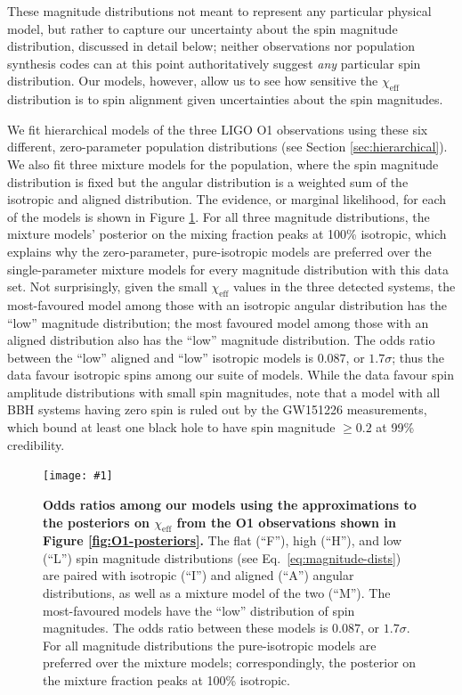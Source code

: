 \documentclass{nature}
\newcommand{\chieff}{\chi_\mathrm{eff}}
\newcommand{\OOneSigmaIsoAligned}{1.7}
\newcommand{\OOneOddsIsoAligned}{0.087}
\newcommand{\plotone}[1]{\texttt{[image: \#1]}}
\begin{document}
These magnitude distributions not meant to represent any particular
physical model, but rather to capture our uncertainty about the spin
magnitude distribution, discussed in detail below; neither
observations nor population synthesis codes can at this point
authoritatively suggest \emph{any} particular spin
distribution\cite{2015PhR...548....1M}.  Our models, however, allow us
to see how sensitive the $\chieff$ distribution is to spin alignment
given uncertainties about the spin magnitudes.

We fit hierarchical models of the three LIGO O1 observations using
these six different, zero-parameter population distributions (see
Section \ref{sec:hierarchical}).  We also fit three mixture models for
the population, where the spin magnitude distribution is fixed but the
angular distribution is a weighted sum of the isotropic and aligned
distribution.  The evidence, or marginal likelihood, for each of the
models is shown in Figure \ref{fig:O1-odds}.  For all three magnitude
distributions, the mixture models' posterior on the mixing fraction
peaks at 100\% isotropic, which explains why the zero-parameter,
pure-isotropic models are preferred over the single-parameter mixture
models for every magnitude distribution with this data set.  Not
surprisingly, given the small $\chieff$ values in the three detected
systems, the most-favoured model among those with an isotropic angular
distribution has the ``low'' magnitude distribution; the most favoured
model among those with an aligned distribution also has the ``low''
magnitude distribution.  The odds ratio between the ``low'' aligned
and ``low'' isotropic models is $\OOneOddsIsoAligned$, or
$\OOneSigmaIsoAligned\sigma$; thus the data favour isotropic spins
among our suite of models.  While the data favour spin amplitude
distributions with small spin magnitudes, note that a model with all
\ac{BBH} systems having zero spin is ruled out by the GW151226
measurements, which bound at least one black hole to have spin
magnitude $\geq 0.2$ at 99\% credibility\cite{2016PhRvL.116x1103A}.

\begin{figure}
  \plotone{../plots/Wills_evidence_ratio_figure_with_mixture_models}
  \caption{\textbf{Odds ratios among our models using the
      approximations to the posteriors on $\chieff$ from the O1
      observations shown in Figure \ref{fig:O1-posteriors}.}  The flat
    (``F''), high (``H''), and low (``L'') spin magnitude
    distributions (see Eq.\ \eqref{eq:magnitude-dists}) are paired
    with isotropic (``I'') and aligned (``A'') angular distributions,
    as well as a mixture model of the two (``$\mathrm{M}$'').  The
    most-favoured models have the ``low'' distribution of spin
    magnitudes.  The odds ratio between these models is
    $\OOneOddsIsoAligned$, or $\OOneSigmaIsoAligned\sigma$.  For all
    magnitude distributions the pure-isotropic models are preferred
    over the mixture models; correspondingly, the posterior on the
    mixture fraction peaks at 100\% isotropic.}
  \label{fig:O1-odds}
\end{figure}
\end{document}
